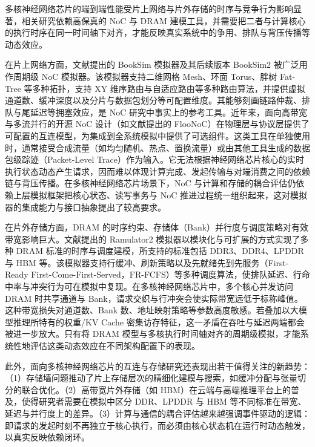 
多核神经网络芯片的端到端性能受片上网络与片外存储的时序与竞争行为影响显著，相关研究依赖高保真的 NoC 与 DRAM 建模工具，并需要把二者与计算核心的执行时序在同一时间轴下对齐，才能反映真实系统中的争用、排队与背压传播等动态效应。

在片上网络方面，文献\parencite{jiang2013booksim}提出的 BookSim 模拟器及其后续版本 BookSim2 被广泛用作周期级 NoC 模拟器。该模拟器支持二维网格 Mesh、环面 Torus、胖树 Fat-Tree 等多种拓扑，支持 XY 维序路由与自适应路由等多种路由算法，并提供虚拟通道数、缓冲深度以及分片与数据包划分等可配置维度。其能够刻画链路仲裁、排队与尾延迟等拥塞效应，是 NoC 研究中事实上的参考工具。近年来，面向高带宽与多流并行的开源 NoC 设计（如文献\parencite{flooonoc2024}提出的 FlooNoC）在物理层与协议层提供了可配置的互连模型，为集成到全系统模拟中提供了可选组件。这类工具在单独使用时，通常接受合成流量（如均匀随机、热点、置换流量）或由其他工具生成的数据包级踪迹（Packet-Level Trace）作为输入。它无法根据神经网络芯片核心的实时执行状态动态产生请求，因而难以体现计算完成、发起传输与对端消费之间的依赖链与背压传播。在多核神经网络芯片场景下，NoC 与计算和存储的耦合评估仍依赖上层模拟框架把核心状态、读写事务与 NoC 推进过程统一组织起来，这对模拟器的集成能力与接口抽象提出了较高要求。

在片外存储方面，DRAM 的时序约束、存储体（Bank）并行度与调度策略对有效带宽影响巨大。文献\parencite{luo2023ramulator2}提出的 Ramulator2 模拟器以模块化与可扩展的方式实现了多种 DRAM 标准的时序与调度建模，所支持的标准包括 DDR3、DDR4、LPDDR 与 HBM 等。该模拟器支持行缓冲、刷新策略以及先就绪先到先服务（First-Ready First-Come-First-Served，FR-FCFS）等多种调度算法，使排队延迟、行命中率与冲突行为可在模拟中复现。在多核神经网络芯片中，多个核心并发访问 DRAM 时共享通道与 Bank，请求交织与行冲突会使实际带宽远低于标称峰值。这种带宽损失对通道数、Bank 数、地址映射策略等参数高度敏感。若叠加以大模型推理所特有的权重/KV Cache 密集访存特征，这一矛盾在吞吐与延迟两端都会被进一步放大\cite{gholami2024aimemorywall}。只有将 DRAM 模型与多核执行时间轴对齐的周期级模拟，才能系统性地评估这类动态效应在不同架构配置下的表现。

此外，面向多核神经网络芯片的互连与存储研究还表现出若干值得关注的新趋势：（1）存储墙问题推动了片上存储层次的精细化建模与搜索，如缓冲分配与张量切分的联合优化\cite{bufferprospector2024,set2023isca}。（2）高带宽片外存储（如 HBM）在云端与高端推理平台上的普及，使得研究者需要在模拟中区分 DDR、LPDDR 与 HBM 等不同标准在带宽、延迟与并行度上的差异。（3）计算与通信的耦合评估越来越强调事件驱动的逻辑：即请求的发起时刻不再独立于核心执行，而必须由核心状态机在运行时动态触发，以真实反映依赖闭环。

